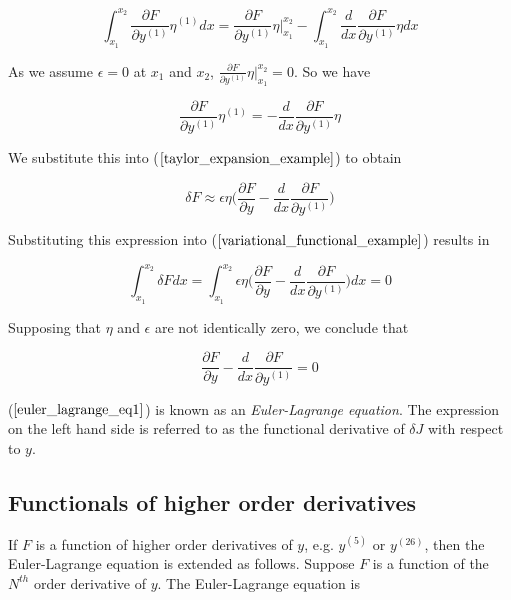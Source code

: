 \documentclass[]{article}
\begin{document}
\begin{equation*} \int_{x_{1}}^{x_{2}} \frac{\partial F}{\partial y^{(1)}}\eta^{(1)}dx = \frac{\partial F}{\partial y^{(1)}}\eta \bigg|_{x_1}^{x_{2}} - \int_{x_{1}}^{x_{2}} \frac{d}{dx}\frac{\partial F}{\partial y^{(1)}}\eta dx\end{equation*}

As we assume $\epsilon =0$ at $x_{1}$ and $x_{2}$, $\frac{\partial F}{\partial y^{(1)}}\eta \bigg|_{x_1}^{x_{2}} = 0$. So we have

\begin{equation*} \frac{\partial F}{\partial y^{(1)}}\eta^{(1)} = - \frac{d}{dx}\frac{\partial F}{\partial y^{(1)}}\eta \end{equation*}

We substitute this into ($\ref{taylor_expansion_example}$) to obtain

\begin{equation*} \delta F \approx \epsilon \eta \bigg(\frac{\partial F}{\partial y} - \frac{d}{dx}\frac{\partial F}{\partial y^{(1)}}\bigg) \label{simplified_taylor_expansion} \end{equation*}

Substituting this expression into ($\ref{variational_functional_example}$) results in

\begin{equation*} \int_{x_{1}}^{x_{2}} \delta F dx = \int_{x_{1}}^{x_{2}} \epsilon \eta \bigg(\frac{\partial F}{\partial y} - \frac{d}{dx}\frac{\partial F}{\partial y^{(1)}}\bigg) dx = 0 \label{variational_eta_final} \end{equation*}

Supposing that $\eta$ and $\epsilon$ are not identically zero, we conclude that 

\begin{equation} \frac{\partial F}{\partial y} - \frac{d}{dx}\frac{\partial F}{\partial y^{(1)}} = 0 \label{euler_lagrange_eq1} \end{equation}

($\ref{euler_lagrange_eq1}$) is known as an \textit{Euler-Lagrange equation}. The expression on the left hand side is referred to as the functional derivative of $\delta J$ with respect to $y$.

\subsection{Functionals of higher order derivatives}
If $F$ is a function of higher order derivatives of $y$, e.g. $y^{(5)}$ or $y^{(26)}$, then the Euler-Lagrange equation is extended as follows. Suppose $F$ is a function of the $N^{th}$ order derivative of $y$. The Euler-Lagrange equation is
\end{document}
